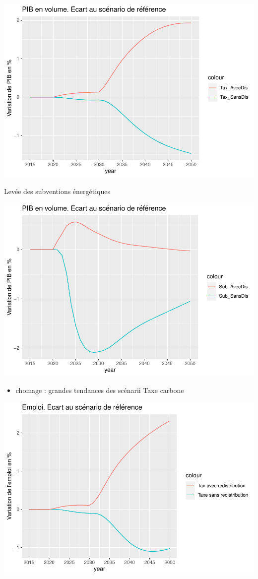 \documentclass[
]{article}
\providecommand{\tightlist}{%
  \setlength{\itemsep}{0pt}\setlength{\parskip}{0pt}}
\begin{document}
\includegraphics{Modele-ThreeMe-Tunisie_Sequeira_Valilou_Wang_files/figure-latex/unnamed-chunk-8-1.pdf}

Levée des subventions énergétiques

\includegraphics{Modele-ThreeMe-Tunisie_Sequeira_Valilou_Wang_files/figure-latex/unnamed-chunk-9-1.pdf}

\begin{itemize}
\tightlist
\item
  chomage : grandes tendances des scénarii Taxe carbone
\end{itemize}

\includegraphics{Modele-ThreeMe-Tunisie_Sequeira_Valilou_Wang_files/figure-latex/unnamed-chunk-10-1.pdf}
\end{document}
